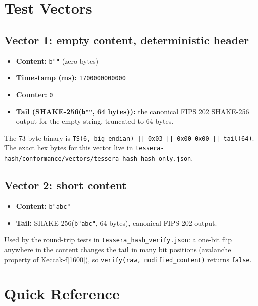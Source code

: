 \appendix

\section{Test Vectors}
\label{sec:appendix-vectors}

\subsection*{Vector 1: empty content, deterministic header}

\begin{itemize}
\item \textbf{Content:} \texttt{b""} (zero bytes)
\item \textbf{Timestamp (ms):} \texttt{1700000000000}
\item \textbf{Counter:} \texttt{0}
\item \textbf{Tail (SHAKE-256(\texttt{b""}, 64 bytes)):} the canonical FIPS 202 \citep{fips202} SHAKE-256 output for the empty string, truncated to 64 bytes.
\end{itemize}

The 73-byte binary is \texttt{TS(6, big-endian) || 0x03 || 0x00 0x00 || tail(64)}. The exact hex bytes for this vector live in \texttt{tessera-hash/conformance/vectors/tessera\_hash\_hash\_only.json}.

\subsection*{Vector 2: short content}

\begin{itemize}
\item \textbf{Content:} \texttt{b"abc"}
\item \textbf{Tail:} SHAKE-256(\texttt{b"abc"}, 64 bytes), canonical FIPS 202 output.
\end{itemize}

Used by the round-trip tests in \texttt{tessera\_hash\_verify.json}: a one-bit flip anywhere in the content changes the tail in many bit positions (avalanche property of Keccak-f[1600]), so \texttt{verify(raw, modified\_content)} returns \texttt{false}.

\section{Quick Reference}
\label{sec:appendix-quickref}


